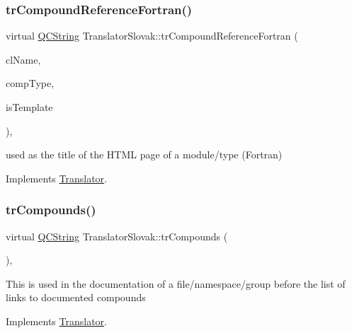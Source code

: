 \subsubsection{\texorpdfstring{trCompoundReferenceFortran()}{trCompoundReferenceFortran()}}
{\footnotesize\ttfamily virtual \mbox{\hyperlink{class_q_c_string}{Q\+C\+String}} Translator\+Slovak\+::tr\+Compound\+Reference\+Fortran (\begin{DoxyParamCaption}\item[{const char $\ast$}]{cl\+Name,  }\item[{\mbox{\hyperlink{class_class_def_ae70cf86d35fe954a94c566fbcfc87939}{Class\+Def\+::\+Compound\+Type}}}]{comp\+Type,  }\item[{bool}]{is\+Template }\end{DoxyParamCaption})\hspace{0.3cm}{\ttfamily [inline]}, {\ttfamily [virtual]}}

used as the title of the H\+T\+ML page of a module/type (Fortran) 

Implements \mbox{\hyperlink{class_translator}{Translator}}.

\mbox{\label{class_translator_slovak_a2cf71d8b38d6fc27407c22bfe94ffccb}} 
\subsubsection{\texorpdfstring{trCompounds()}{trCompounds()}}
{\footnotesize\ttfamily virtual \mbox{\hyperlink{class_q_c_string}{Q\+C\+String}} Translator\+Slovak\+::tr\+Compounds (\begin{DoxyParamCaption}{ }\end{DoxyParamCaption})\hspace{0.3cm}{\ttfamily [inline]}, {\ttfamily [virtual]}}

This is used in the documentation of a file/namespace/group before the list of links to documented compounds 

Implements \mbox{\hyperlink{class_translator}{Translator}}.

\mbox{\label{class_translator_slovak_a5d185eed5094fd3f6efc999d7ce31da6}} 
